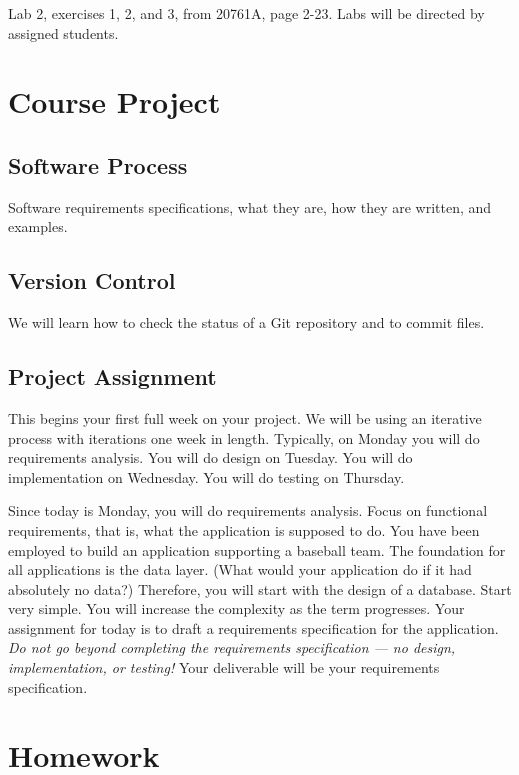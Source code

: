 \documentclass{article}
\begin{document}
Lab 2, exercises 1, 2, and 3, from 20761A, page 2-23. Labs will be directed by assigned students.


    \section{Course Project}

        \subsection{Software Process}

        Software requirements specifications, what they are, how they are written, and examples.
        
        \subsection{Version Control}

        We will learn how to check the status of a Git repository and to commit files.

        \subsection{Project Assignment}

        This begins your first full week on your project. We will be using an iterative process with iterations one week in length. Typically, on Monday you will do requirements analysis. You will do design on Tuesday. You will do implementation on Wednesday. You will do testing on Thursday.

        Since today is Monday, you will do requirements analysis. Focus on functional requirements, that is, what the application is supposed to do. You have been employed to build an application supporting a baseball team. The foundation for all applications is the data layer. (What would your application do if it had absolutely no data?) Therefore, you will start with the design of a database. Start very simple. You will increase the complexity as the term progresses. Your assignment for today is to draft a requirements specification for the application. \textit{Do not go beyond completing the requirements specification --- no design, implementation, or testing!} Your deliverable will be your requirements specification.


    \section{Homework}
\end{document}
